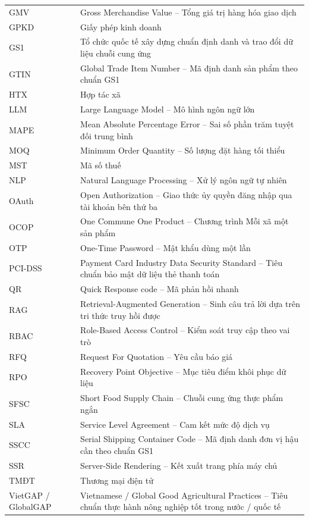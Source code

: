 \begin{longtable}{L{3.4cm} L{12cm}}
GMV & Gross Merchandise Value -- Tổng giá trị hàng hóa giao dịch \\
GPKD & Giấy phép kinh doanh \\
GS1 & Tổ chức quốc tế xây dựng chuẩn định danh và trao đổi dữ liệu chuỗi cung ứng \\
GTIN & Global Trade Item Number -- Mã định danh sản phẩm theo chuẩn GS1 \\
HTX & Hợp tác xã \\
LLM & Large Language Model -- Mô hình ngôn ngữ lớn \\
MAPE & Mean Absolute Percentage Error -- Sai số phần trăm tuyệt đối trung bình \\
MOQ & Minimum Order Quantity -- Số lượng đặt hàng tối thiểu \\
MST & Mã số thuế \\
NLP & Natural Language Processing -- Xử lý ngôn ngữ tự nhiên \\
OAuth & Open Authorization -- Giao thức ủy quyền đăng nhập qua tài khoản bên thứ ba \\
OCOP & One Commune One Product -- Chương trình Mỗi xã một sản phẩm \\
OTP & One-Time Password -- Mật khẩu dùng một lần \\
PCI-DSS & Payment Card Industry Data Security Standard -- Tiêu chuẩn bảo mật dữ liệu thẻ thanh toán \\
QR & Quick Response code -- Mã phản hồi nhanh \\
RAG & Retrieval-Augmented Generation -- Sinh câu trả lời dựa trên tri thức truy hồi được \\
RBAC & Role-Based Access Control -- Kiểm soát truy cập theo vai trò \\
RFQ & Request For Quotation -- Yêu cầu báo giá \\
RPO & Recovery Point Objective -- Mục tiêu điểm khôi phục dữ liệu \\
SFSC & Short Food Supply Chain -- Chuỗi cung ứng thực phẩm ngắn \\
SLA & Service Level Agreement -- Cam kết mức độ dịch vụ \\
SSCC & Serial Shipping Container Code -- Mã định danh đơn vị hậu cần theo chuẩn GS1 \\
SSR & Server-Side Rendering -- Kết xuất trang phía máy chủ \\
TMĐT & Thương mại điện tử \\
VietGAP / GlobalGAP & Vietnamese / Global Good Agricultural Practices -- Tiêu chuẩn thực hành nông nghiệp tốt trong nước / quốc tế \\
\end{longtable}
\endgroup
